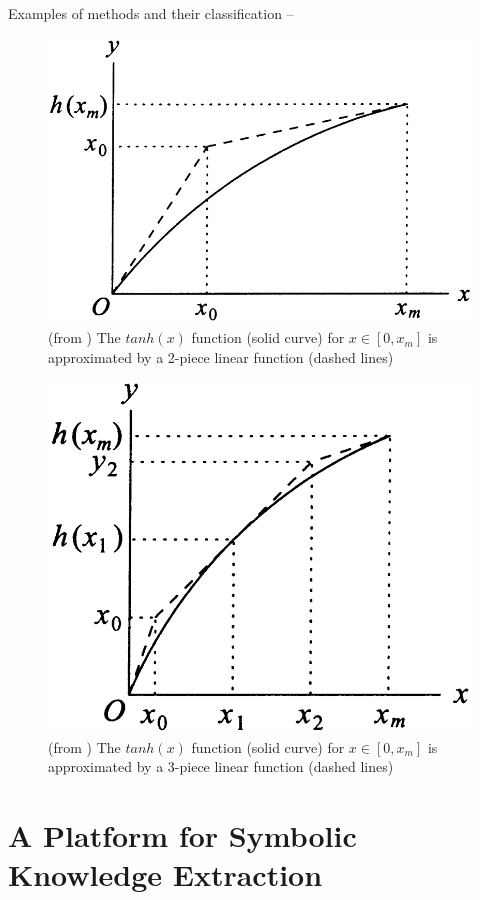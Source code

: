 \documentclass[presentation]{beamer}\mode<presentation>{\usetheme{AMSBolognaFC}}
\begin{document}
\begin{frame}[allowframebreaks]{Examples of methods and their classification -- }
    \begin{figure}\centering
        \includegraphics[width=.6\linewidth]{figures/refann/2-steps.png}
        \caption{(from \cite{setiono2002extraction}) The $tanh(x)$ function (solid curve) for $x \in [0,x_m]$ is approximated by a 2-piece linear function (dashed lines)}
    \end{figure}

    \begin{figure}\centering
        \includegraphics[width=.6\linewidth]{figures/refann/3-steps.png}
        \caption{(from \cite{setiono2002extraction}) The $tanh(x)$ function (solid curve) for $x \in [0,x_m]$ is approximated by a 3-piece linear function (dashed lines)}
    \end{figure}
    
\end{frame}

\section{A Platform for Symbolic Knowledge Extraction}
\end{document}
